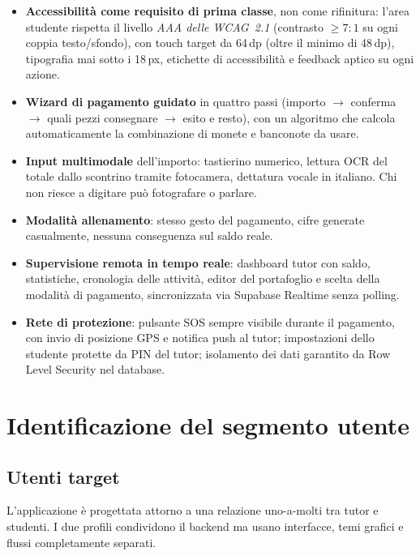 \documentclass[11pt,a4paper]{article}
\begin{document}
\begin{itemize}[leftmargin=1.4cm]
  \item \textbf{Accessibilit\`a come requisito di prima classe}, non come rifinitura: l'area
  studente rispetta il livello \emph{AAA delle WCAG~2.1} (contrasto $\geq 7{:}1$ su ogni coppia
  testo/sfondo), con touch target da 64\,dp (oltre il minimo di 48\,dp), tipografia mai sotto i
  18\,px, etichette di accessibilit\`a e feedback aptico su ogni azione.
  \item \textbf{Wizard di pagamento guidato} in quattro passi (importo $\rightarrow$ conferma
  $\rightarrow$ quali pezzi consegnare $\rightarrow$ esito e resto), con un algoritmo che calcola
  automaticamente la combinazione di monete e banconote da usare.
  \item \textbf{Input multimodale} dell'importo: tastierino numerico, lettura OCR del totale dallo
  scontrino tramite fotocamera, dettatura vocale in italiano. Chi non riesce a digitare pu\`o
  fotografare o parlare.
  \item \textbf{Modalit\`a allenamento}: stesso gesto del pagamento, cifre generate casualmente,
  nessuna conseguenza sul saldo reale.
  \item \textbf{Supervisione remota in tempo reale}: dashboard tutor con saldo, statistiche,
  cronologia delle attivit\`a, editor del portafoglio e scelta della modalit\`a di pagamento,
  sincronizzata via Supabase Realtime senza polling.
  \item \textbf{Rete di protezione}: pulsante SOS sempre visibile durante il pagamento, con invio
  di posizione GPS e notifica push al tutor; impostazioni dello studente protette da PIN del
  tutor; isolamento dei dati garantito da Row Level Security nel database.
\end{itemize}

\section{Identificazione del segmento utente}

\subsection{Utenti target}

L'applicazione \`e progettata attorno a una relazione uno-a-molti tra tutor e studenti. I due
profili condividono il backend ma usano interfacce, temi grafici e flussi completamente separati.
\end{document}

